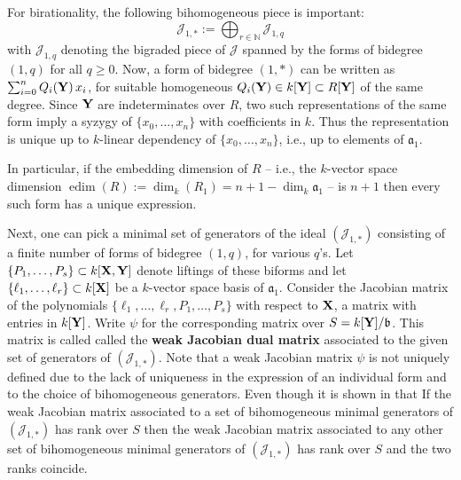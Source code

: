 \documentclass[12pt]{amsart}
\numberwithin{equation}{theorem}
\def\XX{{\bf X}}
\def\YY{{\bf Y}}
\renewcommand{\:}{\colon}
\DeclareMathOperator{\edim}{edim}
\theoremstyle{theorem}
\begin{document}
For birationality, the following bihomogeneous piece is  important:
$${\mathcal J}_{1,*}:=\bigoplus_{r\in\mathbb{N}} {\mathcal J}_{1,q}$$
with ${\mathcal J}_{1,q}$ denoting the bigraded piece of ${\mathcal J}$ spanned by the forms of bidegree
 $(1,q)$ for all $q\geq 0$. Now, a form of bidegree $(1,*)$ can be written as $\sum_{i=0}^n Q_i(\YY)\,x_i$, for suitable homogeneous $Q_i(\YY)\in k[\YY]\subset R[\YY]$
of the same degree.
Since $\YY$ are indeterminates over $R$, two such representations of the same form imply a syzygy of $\{x_0,\ldots,x_n\}$
with coefficients in $k$. Thus the representation is unique  up to $k$-linear dependency
of $\{x_0,\ldots,x_n\}$,  i.e., up to elements of ${\mathfrak a}_1$.

In particular, if the {\sc embedding dimension} of $R$ -- i.e., the $k$-vector space dimension
$\edim (R):=\dim_k(R_1)=n+1-\dim_k {\mathfrak a}_1$ -- is $n+1$ then every such form has a unique expression.

Next, one can pick a minimal set of generators of the ideal $({\mathcal J}_{1,*})$ consisting of a finite number
of forms of bidegree $(1,q)$, for various $q$'s.
Let $\{P_1,\ldots,P_s\}\subset k[\XX,\YY]$ denote liftings of these biforms and let $\{\ell_1,\ldots,\ell_r\}\subset k[\XX]$ be  a $k$-vector space
basis of ${\mathfrak a}_1$.
Consider the Jacobian matrix of the polynomials $\{\ell_1,\ldots,\ell_r, P_1,\ldots,P_s\}$ with respect to $\XX$, a matrix with entries in $k[\YY]$.
Write $\psi$ for the corresponding matrix over $S=k[\YY]/{\mathfrak b}$. This matrix is called  called the {\bf weak Jacobian dual matrix}  associated to
the given set of generators of $({\mathcal J}_{1,*})$.
Note that a weak Jacobian matrix $\psi$ is not uniquely defined due to the lack of uniqueness in the expression of
an individual form and to the choice of bihomogeneous generators. Even though it is shown in \cite[Lemma 2.13]{DoriaHassanzadehSimisBirationality} that  If the weak Jacobian matrix associated  to a set of bihomogeneous minimal generators of
$({\mathcal J}_{1,*})$ has rank over $S$ then the weak Jacobian matrix associated to any other
set of bihomogeneous minimal generators of
$({\mathcal J}_{1,*})$ has  rank over $S$ and the two ranks coincide.
\end{document}
